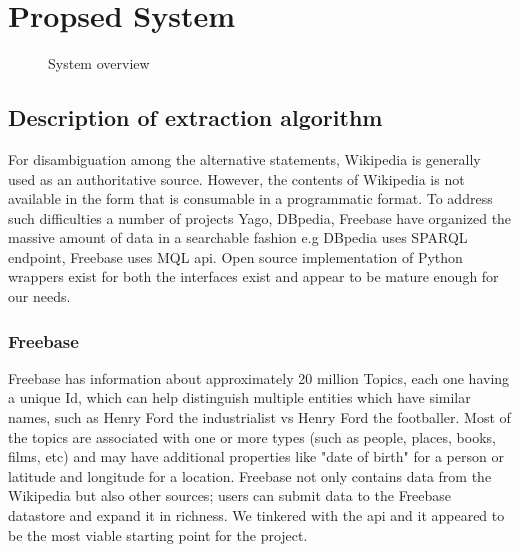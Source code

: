 \documentclass[11pt]{article}
\begin{document}
\section {Propsed System}


\begin{figure}
  \centering
  \caption{System overview}
  \label{fig:system}
\end{figure}


\subsection{Description of extraction algorithm}

For disambiguation among the alternative statements, Wikipedia is generally used
as an authoritative source. However, the contents of Wikipedia is not available
in the form that is consumable in a programmatic format. To address such
difficulties a number of projects Yago, DBpedia, Freebase have organized the
massive amount of data in a searchable fashion e.g DBpedia uses SPARQL endpoint,
Freebase uses MQL api. Open source implementation of Python wrappers exist for
both the interfaces exist and appear to be mature enough for our needs.

\subsubsection{Freebase} 
Freebase has information about approximately 20 million Topics, each one having a
unique Id, which can help distinguish multiple entities which have similar names,
such as Henry Ford the industrialist vs Henry Ford the footballer. Most of the
topics are associated with one or more types\cite{freebasetype} (such as
people, places, books, films, etc) and may have additional properties like "date of birth" for a person
or latitude and longitude for a location. Freebase not only contains data from
the Wikipedia but also other sources; users can submit data to the Freebase
datastore and expand it in richness. We tinkered with the api\cite{freebaseapi}
and it appeared to be the most viable starting point for the project.
\end{document}
